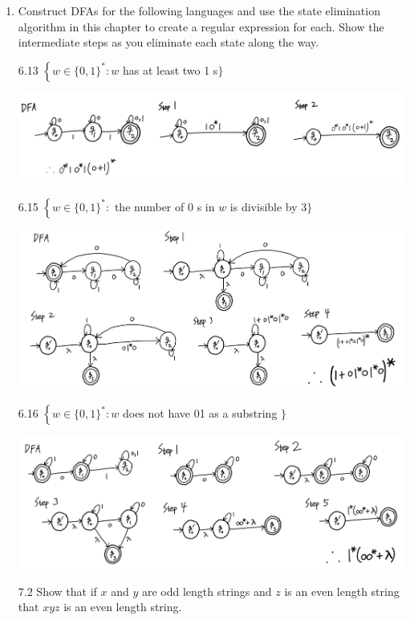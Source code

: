 \documentclass[10pt]{article}
\begin{document}
\begin{enumerate}[label={}]
      \item Construct DFAs for the following languages and use the state elimination algorithm in this chapter to create a regular expression for each. Show the intermediate steps as you eliminate each state along the way.

            6.13 $\left\{w \in\{0,1\}^*: w\right.$ has at least two 1 s$\}$

            \includegraphics[scale=0.5]{6.13}


            6.15 $\left\{w \in\{0,1\}^*:\right.$ the number of 0 s in $w$ is divisible by 3$\}$

            \includegraphics[scale=0.45]{6.15}


            6.16 $\left\{w \in\{0,1\}^*: w\right.$ does not have 01 as a substring $\}$

            \includegraphics[scale=0.5]{6.16}

            \newpage

            7.2 Show that if $x$ and $y$ are odd length strings and $z$ is an even length string that $x y z$ is an even length string.



\end{enumerate}
\end{document}
